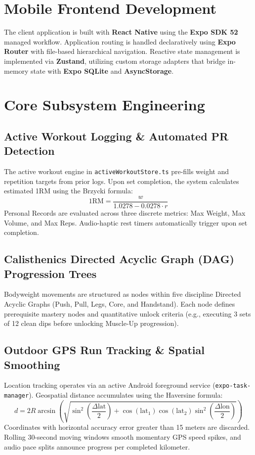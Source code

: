 \documentclass[12pt,a4paper]{report}
\begin{document}
\section{Mobile Frontend Development}
The client application is built with \textbf{React Native} using the \textbf{Expo SDK 52} managed workflow. Application routing is handled declaratively using \textbf{Expo Router} with file-based hierarchical navigation. Reactive state management is implemented via \textbf{Zustand}, utilizing custom storage adapters that bridge in-memory state with \textbf{Expo SQLite} and \textbf{AsyncStorage}.

\section{Core Subsystem Engineering}

\subsection{Active Workout Logging \& Automated PR Detection}
The active workout engine in \texttt{activeWorkoutStore.ts} pre-fills weight and repetition targets from prior logs. Upon set completion, the system calculates estimated 1RM using the Brzycki formula:
\begin{equation}
1\text{RM} = \frac{w}{1.0278 - 0.0278 \cdot r}
\end{equation}
Personal Records are evaluated across three discrete metrics: Max Weight, Max Volume, and Max Reps. Audio-haptic rest timers automatically trigger upon set completion.

\subsection{Calisthenics Directed Acyclic Graph (DAG) Progression Trees}
Bodyweight movements are structured as nodes within five discipline Directed Acyclic Graphs (Push, Pull, Legs, Core, and Handstand). Each node defines prerequisite mastery nodes and quantitative unlock criteria (e.g., executing 3 sets of 12 clean dips before unlocking Muscle-Up progression).

\subsection{Outdoor GPS Run Tracking \& Spatial Smoothing}
Location tracking operates via an active Android foreground service (\texttt{expo-task-manager}). Geospatial distance accumulates using the Haversine formula:
\begin{equation}
d = 2R \arcsin\left(\sqrt{\sin^2\left(\frac{\Delta \text{lat}}{2}\right) + \cos(\text{lat}_1)\cos(\text{lat}_2)\sin^2\left(\frac{\Delta \text{lon}}{2}\right)}\right)
\end{equation}
Coordinates with horizontal accuracy error greater than 15 meters are discarded. Rolling 30-second moving windows smooth momentary GPS speed spikes, and audio pace splits announce progress per completed kilometer.
\end{document}

